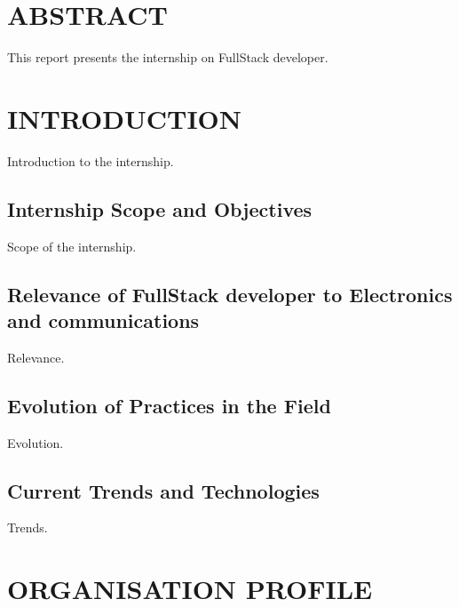 \documentclass[12pt,a4paper]{report}
\begin{document}
\newpage
\chapter*{ABSTRACT}


This report presents the internship on FullStack developer.


\newpage
\tableofcontents
{}

\newpage
\listoffigures
{}

\chapter{INTRODUCTION}


Introduction to the internship.


\section{Internship Scope and Objectives}

Scope of the internship.


\section{Relevance of FullStack developer to Electronics and communications}

Relevance.


\section{Evolution of Practices in the Field}

Evolution.


\section{Current Trends and Technologies}

Trends.




\chapter{ORGANISATION PROFILE}
\end{document}

